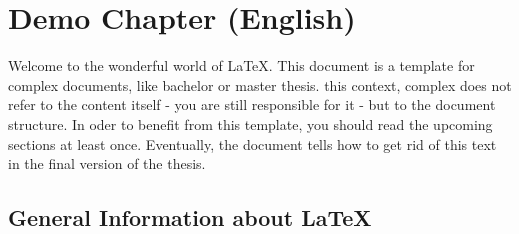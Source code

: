 %
%
%
\chapter{Demo Chapter (English)}
%
Welcome to the wonderful world of \LaTeX{}.
This document is a template for complex documents, like bachelor
or master thesis.
this context, complex does not refer to the content itself -
you are still responsible for it - but to the document structure.
In oder to benefit from this template, you should read the upcoming
sections at least once.
Eventually, the document tells how to get rid of this text in the final
version of the thesis.
%
\section{General Information about \LaTeX{}}
%
